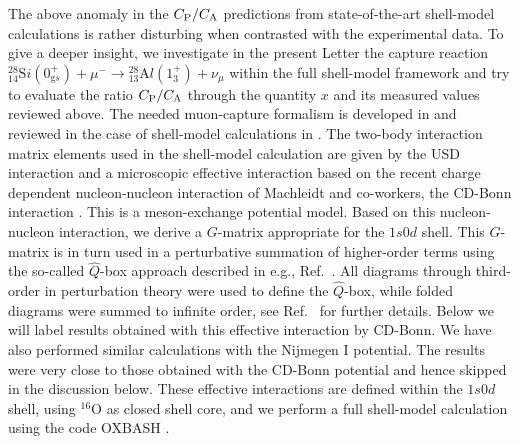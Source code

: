 \begin{multicols}{2}
The above anomaly in the $C_{\rm P}/C_{\rm A}$ predictions from
state-of-the-art shell-model calculations is rather disturbing when
contrasted with the experimental data. To give a deeper insight, we investigate
in the present Letter the capture reaction
${}^{28}_{14}{\mathrm Si}(0^+_{\mathrm gs})+\mu^-
\rightarrow{}^{28}_{13}{\mathrm Al}(1^+_3)+\nu_\mu$ within
the full shell-model framework and try to evaluate
the ratio $C_{\rm P}/C_{\rm A}$ through the quantity $x$ and its measured
values reviewed above. The needed muon-capture formalism is developed
in \cite{mor} and reviewed in the case
of shell-model calculations in \cite{KUZ94,sii}. The two-body interaction
matrix elements used in the shell-model calculation are given by the
USD interaction \cite{wil} and a microscopic effective
interaction based on the recent charge dependent nucleon-nucleon
interaction of Machleidt and co-workers,
the CD-Bonn interaction \cite{mac96}. This is a meson-exchange
potential model. Based on this nucleon-nucleon
interaction, we derive a $G$-matrix appropriate for
the $1s0d$ shell. This $G$-matrix is in turn used in a
perturbative summation of higher-order terms using the
so-called $\hat{Q}$-box approach described in e.g., Ref.\ \cite{hko95}.
All diagrams through third-order in perturbation
theory were used to define the $\hat{Q}$-box, while folded
diagrams were summed to infinite order, see Ref.\  \cite{hko95}
for further details. Below we will label results obtained with this
effective interaction by CD-Bonn. We have also performed similar
calculations with the Nijmegen I \cite{nim94}
potential. The results were very close to those obtained with the CD-Bonn
potential and hence skipped in the discussion below.
These effective interactions
are defined within the
$1s0d$ shell, using $^{16}$O as closed shell core,
and we perform a full shell-model calculation
using the code OXBASH \cite{oxb}.


\end{multicols}
